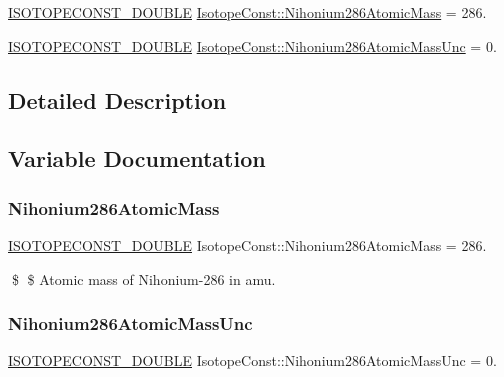 \begin{DoxyCompactItemize}
\item 
\mbox{\hyperlink{group___isotope_const-_macros_ga8f45a7272ce02c0b4c65c44636ed719a}{I\+S\+O\+T\+O\+P\+E\+C\+O\+N\+S\+T\+\_\+\+D\+O\+U\+B\+LE}} \mbox{\hyperlink{group___isotope_const-_nihonium-_nh286_gad7ac530aa91c416ec97e44df23fd95c1}{Isotope\+Const\+::\+Nihonium286\+Atomic\+Mass}} = 286.
\item 
\mbox{\hyperlink{group___isotope_const-_macros_ga8f45a7272ce02c0b4c65c44636ed719a}{I\+S\+O\+T\+O\+P\+E\+C\+O\+N\+S\+T\+\_\+\+D\+O\+U\+B\+LE}} \mbox{\hyperlink{group___isotope_const-_nihonium-_nh286_ga2f72da88ab1162c631f28ec915b46cdf}{Isotope\+Const\+::\+Nihonium286\+Atomic\+Mass\+Unc}} = 0.
\end{DoxyCompactItemize}


\subsection{Detailed Description}


\subsection{Variable Documentation}
\mbox{\label{group___isotope_const-_nihonium-_nh286_gad7ac530aa91c416ec97e44df23fd95c1}} 
\subsubsection{\texorpdfstring{Nihonium286\+Atomic\+Mass}{Nihonium286AtomicMass}}
{\footnotesize\ttfamily \mbox{\hyperlink{group___isotope_const-_macros_ga8f45a7272ce02c0b4c65c44636ed719a}{I\+S\+O\+T\+O\+P\+E\+C\+O\+N\+S\+T\+\_\+\+D\+O\+U\+B\+LE}} Isotope\+Const\+::\+Nihonium286\+Atomic\+Mass = 286.}

\$ \$ Atomic mass of Nihonium-\/286 in amu. \mbox{\label{group___isotope_const-_nihonium-_nh286_ga2f72da88ab1162c631f28ec915b46cdf}} 
\subsubsection{\texorpdfstring{Nihonium286\+Atomic\+Mass\+Unc}{Nihonium286AtomicMassUnc}}
{\footnotesize\ttfamily \mbox{\hyperlink{group___isotope_const-_macros_ga8f45a7272ce02c0b4c65c44636ed719a}{I\+S\+O\+T\+O\+P\+E\+C\+O\+N\+S\+T\+\_\+\+D\+O\+U\+B\+LE}} Isotope\+Const\+::\+Nihonium286\+Atomic\+Mass\+Unc = 0.}

